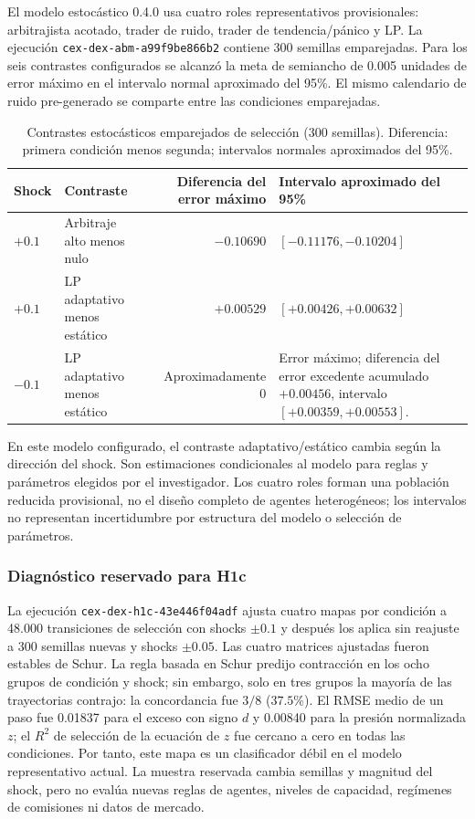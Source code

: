 El modelo estocástico 0.4.0 usa cuatro roles representativos provisionales:
arbitrajista acotado, trader de ruido, trader de tendencia/pánico y LP. La ejecución
\texttt{cex-dex-abm-a99f9be866b2} contiene 300 semillas emparejadas. Para los seis
contrastes configurados se alcanzó la meta de semiancho de 0.005 unidades de error
máximo en el intervalo normal aproximado del 95\%. El mismo calendario de ruido
pre-generado se comparte entre las condiciones emparejadas.

\begin{table}[!ht]
\centering
\scriptsize
\caption{Contrastes estocásticos emparejados de selección (300 semillas). Diferencia:
primera condición menos segunda; intervalos normales aproximados del 95\%.}
\begin{tabularx}{\textwidth}{@{}>{\raggedright\arraybackslash}p{3.3cm} >{\raggedright\arraybackslash}p{3cm} r X@{}}
\toprule
\textbf{Shock} & \textbf{Contraste} & \textbf{Diferencia del error máximo} &
\textbf{Intervalo aproximado del 95\%} \\
\midrule
$+0.1$ & Arbitraje alto menos nulo & $-0.10690$ & $[-0.11176,-0.10204]$ \\
$+0.1$ & LP adaptativo menos estático & $+0.00529$ & $[+0.00426,+0.00632]$ \\
$-0.1$ & LP adaptativo menos estático & Aproximadamente $0$ & Error máximo; diferencia
  del error excedente acumulado $+0.00456$, intervalo $[+0.00359,+0.00553]$. \\
\bottomrule
\end{tabularx}
\end{table}

En este modelo configurado, el contraste adaptativo/estático cambia según la dirección
del shock. Son estimaciones condicionales al modelo para reglas y parámetros elegidos
por el investigador. Los cuatro roles forman una población reducida provisional, no el
diseño completo de agentes heterogéneos; los intervalos no representan incertidumbre
por estructura del modelo o selección de parámetros.

\subsubsection{Diagnóstico reservado para H1c}

La ejecución \texttt{cex-dex-h1c-43e446f04adf} ajusta cuatro mapas por condición a
48.000 transiciones de selección con shocks $\pm0.1$ y después los aplica sin reajuste
a 300 semillas nuevas y shocks $\pm0.05$. Las cuatro matrices ajustadas fueron
estables de Schur. La regla basada en Schur predijo contracción en los ocho grupos de
condición y shock; sin embargo, solo en tres grupos la mayoría de las trayectorias
contrajo: la concordancia fue $3/8$ ($37.5\%$). El RMSE medio de un paso fue 0.01837
para el exceso con signo $d$ y 0.00840 para la presión normalizada $z$; el $R^2$ de
selección de la ecuación de $z$ fue cercano a cero en todas las condiciones. Por tanto,
este mapa es un clasificador débil en el modelo representativo actual. La muestra
reservada cambia semillas y magnitud del shock, pero no evalúa nuevas reglas de agentes,
niveles de capacidad, regímenes de comisiones ni datos de mercado.

